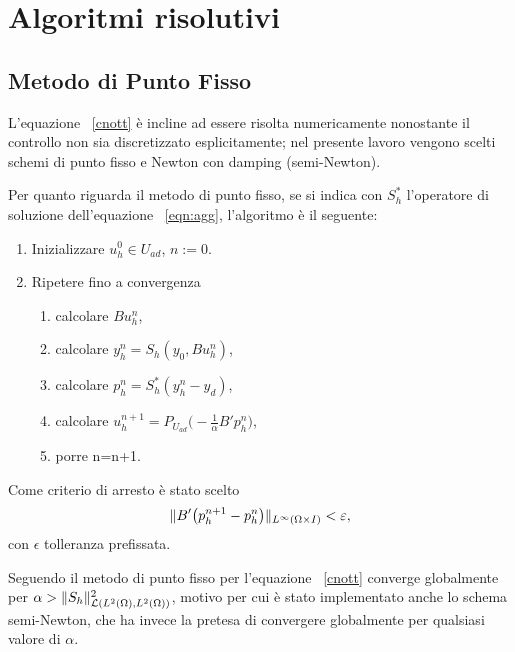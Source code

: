 \section{Algoritmi risolutivi}
\label{chap:AR}
\subsection{Metodo di Punto Fisso}

L'equazione ~\eqref{cnott} è incline ad essere risolta numericamente nonostante il controllo non sia discretizzato esplicitamente; nel presente lavoro vengono scelti schemi di punto fisso e Newton con damping (semi-Newton).

Per quanto riguarda il metodo di punto fisso, se si indica con $ S^*_h $ l'operatore di soluzione dell'equazione ~\eqref{eqn:agg}, l'algoritmo è il seguente:
\begin{algoritmo}

\begin{enumerate}
\item Inizializzare $ u^0_h\in U_{ad} $, $ n:=0 $.
\item Ripetere fino a convergenza
          \begin{enumerate}
          \item calcolare $ Bu^n_h $,
          \item calcolare $ y^n_h=S_h(y_0,Bu^n_h) $, 
          \item calcolare $ p^n_h=S^*_h(y^n_h-y_d) $,
          \item calcolare $ u^{n+1}_h=P_{U_{ad}}\big( -\frac{1}{\alpha}B'p^n_h\big) $,
          \item porre n=n+1.
          \end{enumerate}
\end{enumerate}

Come criterio di arresto è stato scelto   
\begin{equation}
\lVert B'\big(p^{n+1}_h-p^n_h\big)\rVert_{L^{\infty}(\Omega\times I)}<\varepsilon,
\label{eq:PuntoFissotoll}
\end{equation}
con $ \epsilon $ tolleranza prefissata.
\label{PuntoFisso}
\end{algoritmo}

Seguendo \cite{HV12} il metodo di punto fisso per l'equazione ~\eqref{cnott} converge globalmente per $ \alpha>\lVert S_h\rVert^2_{\mathcal{L}(L^2(\Omega),L^2(\Omega))} $, motivo per cui è stato implementato anche lo schema semi-Newton, che ha invece la pretesa di convergere globalmente per qualsiasi valore di $ \alpha $.

